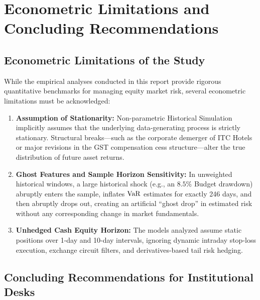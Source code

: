 
\section{Econometric Limitations and Concluding Recommendations}
\label{sec:limitations_conclusions}

\subsection{Econometric Limitations of the Study}

While the empirical analyses conducted in this report provide rigorous quantitative benchmarks for managing equity market risk, several econometric limitations must be acknowledged:
\begin{enumerate}[leftmargin=1.5em, itemsep=1pt, parsep=0pt, label=(\alph*)]
    \item \textbf{Assumption of Stationarity:} Non-parametric Historical Simulation implicitly assumes that the underlying data-generating process is strictly stationary. Structural breaks—such as the corporate demerger of ITC Hotels or major revisions in the GST compensation cess structure—alter the true distribution of future asset returns.
    \item \textbf{Ghost Features and Sample Horizon Sensitivity:} In unweighted historical windows, a large historical shock (e.g., an $8.5\%$ Budget drawdown) abruptly enters the sample, inflates $\operatorname{VaR}$ estimates for exactly 246 days, and then abruptly drops out, creating an artificial ``ghost drop'' in estimated risk without any corresponding change in market fundamentals.
    \item \textbf{Unhedged Cash Equity Horizon:} The models analyzed assume static positions over 1-day and 10-day intervals, ignoring dynamic intraday stop-loss execution, exchange circuit filters, and derivatives-based tail risk hedging.
\end{enumerate}

\subsection{Concluding Recommendations for Institutional Desks}

